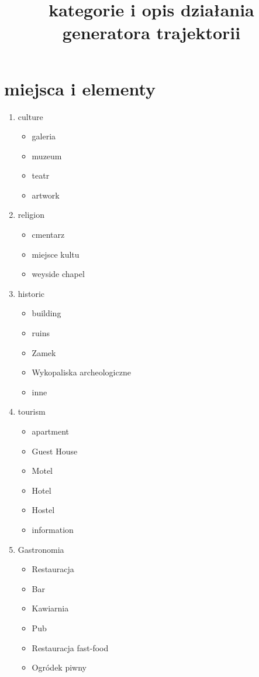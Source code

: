 \documentclass[]{article}
\title{kategorie i opis działania generatora trajektorii}
\begin{document}
\maketitle

\section{miejsca i elementy}
\begin{enumerate}
    \item culture
        \begin{itemize}
            \item galeria
            \item muzeum
            \item teatr
            \item artwork
        \end{itemize}
    \item religion
        \begin{itemize}
            \item cmentarz
            \item miejsce kultu
            \item weyside chapel
        \end{itemize}
    \item historic
        \begin{itemize}
            \item building
            \item ruins
            \item Zamek
            \item Wykopaliska archeologiczne
            \item inne
        \end{itemize}
    \item tourism
        \begin{itemize}
            \item apartment
            \item Guest House
            \item Motel
            \item Hotel
            \item Hostel
            \item information
        \end{itemize}
    \item Gastronomia
        \begin{itemize}
            \item Restauracja
            \item Bar
            \item Kawiarnia
            \item Pub
            \item Restauracja fast-food
            \item Ogródek piwny
        \end{itemize}
\end{enumerate}
\end{document}
